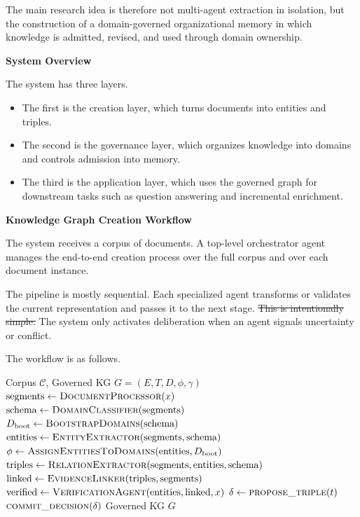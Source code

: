 The main research idea is therefore not multi-agent extraction in
isolation, but the construction of a domain-governed organizational
memory in which knowledge is admitted, revised, and used through domain
ownership.

\textbf{System Overview}

The system has three layers.

\begin{itemize}
\item
  The first is the creation layer, which turns documents into entities
  and triples.
\item
  The second is the governance layer, which organizes knowledge into
  domains and controls admission into memory.
\item
  The third is the application layer, which uses the governed graph for
  downstream tasks such as question answering and incremental
  enrichment.
\end{itemize}

\textbf{Knowledge Graph Creation Workflow}

The system receives a corpus of documents. A top-level orchestrator
agent manages the end-to-end creation process over the full corpus and
over each document instance.

The pipeline is mostly sequential. Each specialized agent transforms or
validates the current representation and passes it to the next stage.
\st{This is intentionally simple.} The system only activates
deliberation when an agent signals uncertainty or conflict.

The workflow is as follows.


\begin{algorithm}[t]
\caption{Governed KG Creation}
\label{alg:gkg-creation}
\begin{algorithmic}[1]
\REQUIRE Corpus $\mathcal{C}$, Governed KG $G=(E,T,D,\phi,\gamma)$
    \STATE $\text{segments} \leftarrow \textsc{DocumentProcessor}(x)$
    \STATE $\text{schema} \leftarrow \textsc{DomainClassifier}(\text{segments})$
    \STATE $D_{\text{boot}} \leftarrow \textsc{BootstrapDomains}(\text{schema})$
    \STATE $\text{entities} \leftarrow \textsc{EntityExtractor}(\text{segments}, \text{schema})$
    \STATE $\phi \leftarrow \textsc{AssignEntitiesToDomains}(\text{entities}, D_{\text{boot}})$
    \STATE $\text{triples} \leftarrow \textsc{RelationExtractor}(\text{segments}, \text{entities}, \text{schema})$
    \STATE $\text{linked} \leftarrow \textsc{EvidenceLinker}(\text{triples}, \text{segments})$
    \STATE $\text{verified} \leftarrow \textsc{VerificationAgent}(\text{entities}, \text{linked}, x)$
        \STATE $\delta \leftarrow \textsc{propose\_triple}(t)$
        \STATE $\textsc{commit\_decision}(\delta)$
    \ENDFOR
\ENDFOR
\RETURN Governed KG $G$
\end{algorithmic}
\end{algorithm}


